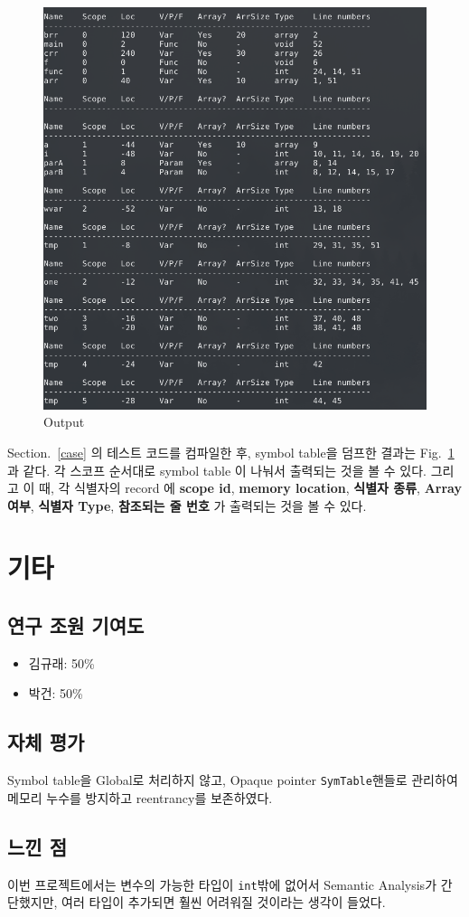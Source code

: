 \documentclass[a4paper, 12p]{paper}
\begin{document}
\begin{figure}[H]
  \centering
\includegraphics[scale=0.5]{figs/testresult.png}
\caption{Output}
\label{fig:output}
\end{figure}

Section.~\ref{case} 의 테스트 코드를 컴파일한 후, symbol table을 덤프한 결과는 Fig.~\ref{fig:output} 과 같다. 각 스코프 순서대로 symbol table 이 나눠서 출력되는 것을 볼 수 있다. 그리고 이 때, 각 식별자의 record 에 \textbf{scope id}, \textbf{memory location}, \textbf{식별자 종류}, \textbf{Array 여부}, \textbf{식별자 Type}, \textbf{참조되는 줄 번호} 가 출력되는 것을 볼 수 있다.


\section{기타}

\subsection{연구 조원 기여도}
\begin{itemize}
	\item 김규래: 50\%
	\item 박건: 50\%
\end{itemize}

\subsection{자체 평가}
Symbol table을 Global로 처리하지 않고, Opaque pointer \texttt{SymTable}핸들로 관리하여 메모리 누수를 방지하고 reentrancy를 보존하였다.

\subsection{느낀 점}
이번 프로젝트에서는 변수의 가능한 타입이 \texttt{int}밖에 없어서 Semantic Analysis가 간단했지만, 여러 타입이 추가되면 훨씬 어려워질 것이라는 생각이 들었다.
\end{document}
